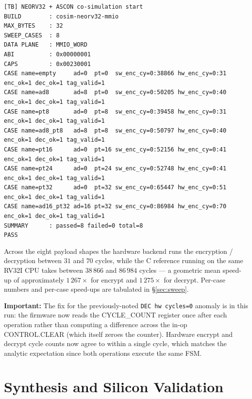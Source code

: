 \documentclass[11pt,a4paper]{article}
\newcommand{\warn}[1]{%
  \begin{tcolorbox}[
    enhanced, colback=warnbg, colframe=warnframe,
    arc=2pt, boxrule=0.5pt, left=6pt, right=6pt, top=3pt, bottom=3pt,
    before upper={\small}
  ]
  \textbf{\color{warnframe}Important:} #1
  \end{tcolorbox}\vspace{3pt}}
\begin{document}
\begin{tcolorbox}[colback=codebg, colframe=docblue, arc=2pt, boxrule=0.4pt,
                  title=\textbf{Captured UART output from the cosim run (excerpt)},
                  fonttitle=\small\bfseries\color{white},
                  coltitle=white]
\begin{lstlisting}[language=shell, basicstyle=\ttfamily\scriptsize]
[TB] NEORV32 + ASCON co-simulation start
BUILD        : cosim-neorv32-mmio
MAX_BYTES    : 32
SWEEP_CASES  : 8
DATA PLANE   : MMIO_WORD
ABI          : 0x00000001
CAPS         : 0x00230001
CASE name=empty     ad=0  pt=0  sw_enc_cy=0:38866 hw_enc_cy=0:31  enc_ok=1 dec_ok=1 tag_valid=1
CASE name=ad8       ad=8  pt=0  sw_enc_cy=0:50205 hw_enc_cy=0:40  enc_ok=1 dec_ok=1 tag_valid=1
CASE name=pt8       ad=0  pt=8  sw_enc_cy=0:39458 hw_enc_cy=0:31  enc_ok=1 dec_ok=1 tag_valid=1
CASE name=ad8_pt8   ad=8  pt=8  sw_enc_cy=0:50797 hw_enc_cy=0:40  enc_ok=1 dec_ok=1 tag_valid=1
CASE name=pt16      ad=0  pt=16 sw_enc_cy=0:52156 hw_enc_cy=0:41  enc_ok=1 dec_ok=1 tag_valid=1
CASE name=pt24      ad=0  pt=24 sw_enc_cy=0:52748 hw_enc_cy=0:41  enc_ok=1 dec_ok=1 tag_valid=1
CASE name=pt32      ad=0  pt=32 sw_enc_cy=0:65447 hw_enc_cy=0:51  enc_ok=1 dec_ok=1 tag_valid=1
CASE name=ad16_pt32 ad=16 pt=32 sw_enc_cy=0:86984 hw_enc_cy=0:70  enc_ok=1 dec_ok=1 tag_valid=1
SUMMARY      : passed=8 failed=0 total=8
PASS
\end{lstlisting}
\end{tcolorbox}

Across the eight payload shapes the hardware backend runs the
encryption / decryption between $31$ and $70$ cycles, while the C
reference running on the same RV32I CPU takes between $38\,866$ and
$86\,984$ cycles --- a geometric mean speed-up of approximately
$1\,267\times$ for encrypt and $1\,275\times$ for decrypt. Per-case
numbers and per-case speed-ups are tabulated in §\ref{sec:sweep}.

\warn{The fix for the previously-noted \texttt{DEC hw cycles=0}
anomaly is in this run: the firmware now reads the CYCLE\_COUNT
register once after each operation rather than computing a difference
across the in-op CONTROL.CLEAR (which itself zeroes the counter).
Hardware encrypt and decrypt cycle counts now agree to within a
single cycle, which matches the analytic expectation since both
operations execute the same FSM.}

\section{Synthesis and Silicon Validation}
\label{sec:silicon}
\end{document}

